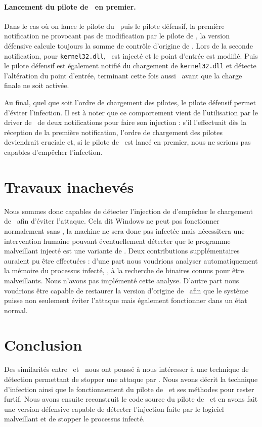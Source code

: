 \paragraph{Lancement du pilote de \duqu\ en premier.}
Dans le cas où on lance le pilote du \duqu\ puis le pilote défensif, la première notification ne provocant pas de modification par le pilote de \duqu, la version défensive calcule toujours la somme de contrôle d'origine de \services.
Lors de la seconde notification, pour \texttt{kernel32.dll}, \duqu\ est injecté et le point d'entrée est modifié. Puis le pilote défensif est également notifié du chargement de \texttt{kernel32.dll} et détecte l'altération du point d'entrée, terminant cette fois aussi \services\ avant que la charge finale ne soit activée.

Au final, quel que soit l'ordre de chargement des pilotes, le pilote défensif permet d'éviter l'infection.
Il est à noter que ce comportement vient de l'utilisation par le driver de \duqu\ de deux notifications pour faire son injection : s'il l'effectuait dès la réception de la première notification, l'ordre de chargement des pilotes deviendrait cruciale et, si le pilote de \duqu\ est lancé en premier, nous ne serions pas capables d'empêcher l'infection.

\section{Travaux inachevés}
Nous sommes donc capables de détecter l'injection de d'empêcher le chargement de \services\ afin d'éviter l'attaque.
Cela dit Windows ne peut pas fonctionner normalement sans \services, la machine ne sera donc pas infectée mais nécessitera une intervention humaine pouvant éventuellement détecter que le programme malveillant injecté est une variante de \stux.
Deux contributions supplémentaires auraient pu être effectuées : d'une part nous voudrions analyser automatiquement la mémoire du processus infecté, \services, à la recherche de binaires connus pour être malveillants. 
Nous n'avons pas implémenté cette analyse.
D'autre part nous voudrions être capable de restaurer la version d'origine de \services\ afin que le système puisse non seulement éviter l'attaque mais également fonctionner dans un état normal.

\section{Conclusion}
Des similarités entre \duqu\ et \stux\ nous ont poussé à nous intéresser à une technique de détection permettant de stopper une attaque par \duqu.
Nous avons décrit la technique d'infection ainsi que le fonctionnement du pilote de \duqu\ et ses méthodes pour rester furtif.
Nous avons ensuite reconstruit le code source du pilote de \duqu\ et en avons fait une version défensive capable de détecter l'injection faite par le logiciel malveillant et de stopper le processus infecté.
